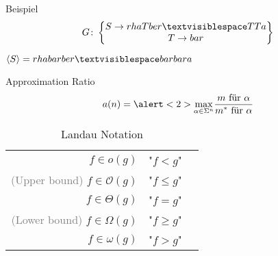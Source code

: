 \begin{frame}{\FrameName}
\begin{block}{Beispiel}
	$$
	G \colon \begin{Bmatrix} 
		S \rightarrow rhaTber \textvisiblespace TTa \\
		T \rightarrow bar
	\end{Bmatrix}
	$$
	
	$\langle S \rangle = rhabarber \textvisiblespace barbara$ 
	\visible<2->{ \linebreak $| \langle S \rangle| = 17$}
	\visible<3->{ \linebreak $\lvert G \lvert = 11$}
\end{block}
\end{frame}

\begin{frame}{\FrameName}
\begin{block}{Approximation Ratio}
	\Gap
	$$
	a(n) = \alert<2>{\max\limits_{\alpha \in \Sigma^n}}\frac{
		\textrm{$m$ für $\alpha$}
	}{
		\textrm{$m^*$ für $\alpha$}
	}
	$$
	
\end{block}
\end{frame}

\begin{frame}{\FrameName}
\begin{table}
	\caption{Landau Notation}
	\begin{tabular}{ r p{3.5cm} l}
		
		$f \in o(g)$ & "$f < g$" \\
		\textcolor{gray}{(Upper bound)} $f \in \mathcal{O}(g)$ & "$f\leq g$" \\
		$f \in \Theta(g)$ & "$f = g$"\\
		\textcolor{gray}{(Lower bound)} $f \in \Omega(g)$ & "$f \geq g$"\\
		$f \in \omega(g)$ & "$f > g$"\\
	\end{tabular}
\end{table}
\end{frame}